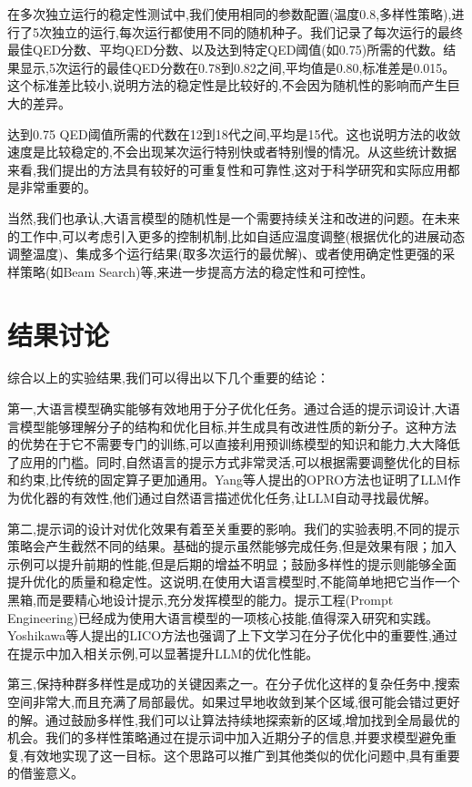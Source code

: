 在多次独立运行的稳定性测试中,我们使用相同的参数配置(温度0.8,多样性策略),进行了5次独立的运行,每次运行都使用不同的随机种子。我们记录了每次运行的最终最佳QED分数、平均QED分数、以及达到特定QED阈值(如0.75)所需的代数。结果显示,5次运行的最佳QED分数在0.78到0.82之间,平均值是0.80,标准差是0.015。这个标准差比较小,说明方法的稳定性是比较好的,不会因为随机性的影响而产生巨大的差异。

达到0.75 QED阈值所需的代数在12到18代之间,平均是15代。这也说明方法的收敛速度是比较稳定的,不会出现某次运行特别快或者特别慢的情况。从这些统计数据来看,我们提出的方法具有较好的可重复性和可靠性,这对于科学研究和实际应用都是非常重要的。

当然,我们也承认,大语言模型的随机性是一个需要持续关注和改进的问题。在未来的工作中,可以考虑引入更多的控制机制,比如自适应温度调整(根据优化的进展动态调整温度)、集成多个运行结果(取多次运行的最优解)、或者使用确定性更强的采样策略(如Beam Search)等,来进一步提高方法的稳定性和可控性。

\section{结果讨论}

综合以上的实验结果,我们可以得出以下几个重要的结论：

第一,大语言模型确实能够有效地用于分子优化任务。通过合适的提示词设计,大语言模型能够理解分子的结构和优化目标,并生成具有改进性质的新分子。这种方法的优势在于它不需要专门的训练,可以直接利用预训练模型的知识和能力,大大降低了应用的门槛。同时,自然语言的提示方式非常灵活,可以根据需要调整优化的目标和约束,比传统的固定算子更加通用。Yang等人\cite{yang2024llm}提出的OPRO方法也证明了LLM作为优化器的有效性,他们通过自然语言描述优化任务,让LLM自动寻找最优解。

第二,提示词的设计对优化效果有着至关重要的影响。我们的实验表明,不同的提示策略会产生截然不同的结果。基础的提示虽然能够完成任务,但是效果有限；加入示例可以提升前期的性能,但是后期的增益不明显；鼓励多样性的提示则能够全面提升优化的质量和稳定性。这说明,在使用大语言模型时,不能简单地把它当作一个黑箱,而是要精心地设计提示,充分发挥模型的能力。提示工程(Prompt Engineering)已经成为使用大语言模型的一项核心技能,值得深入研究和实践。Yoshikawa等人\cite{yoshikawa2025lico}提出的LICO方法也强调了上下文学习在分子优化中的重要性,通过在提示中加入相关示例,可以显著提升LLM的优化性能。

第三,保持种群多样性是成功的关键因素之一。在分子优化这样的复杂任务中,搜索空间非常大,而且充满了局部最优。如果过早地收敛到某个区域,很可能会错过更好的解。通过鼓励多样性,我们可以让算法持续地探索新的区域,增加找到全局最优的机会。我们的多样性策略通过在提示词中加入近期分子的信息,并要求模型避免重复,有效地实现了这一目标。这个思路可以推广到其他类似的优化问题中,具有重要的借鉴意义。

